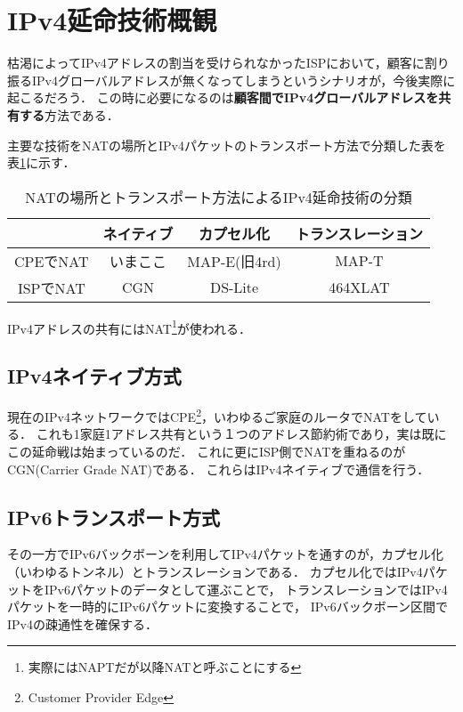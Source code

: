 \section{IPv4延命技術概観}

\lettrine{枯}
渇によってIPv4アドレスの割当を受けられなかったISPにおいて，顧客に割り振るIPv4グローバルアドレスが無くなってしまうというシナリオが，今後実際に起こるだろう．
この時に必要になるのは\textbf{顧客間でIPv4グローバルアドレスを共有する}方法である．

主要な技術をNATの場所とIPv4パケットのトランスポート方法で分類した表を表\ref{yuyarin-nat-transport}に示す．

\begin{table}[htbp]
\begin{center}
\begin{tabular}{cccc} \hline
 & ネイティブ & カプセル化 & トランスレーション \\\hline
CPEでNAT & いまここ & MAP-E(旧4rd) & MAP-T \\
ISPでNAT & CGN & DS-Lite & 464XLAT \\\hline
\end{tabular}
\end{center}
\caption{NATの場所とトランスポート方法によるIPv4延命技術の分類}
\label{yuyarin-nat-transport}
\end{table}

IPv4アドレスの共有にはNAT\footnote{実際にはNAPTだが以降NATと呼ぶことにする}が使われる．

\subsection{IPv4ネイティブ方式}

現在のIPv4ネットワークではCPE\footnote{Customer Provider Edge}，いわゆるご家庭のルータでNATをしている．
これも1家庭1アドレス共有という１つのアドレス節約術であり，実は既にこの延命戦は始まっているのだ．
これに更にISP側でNATを重ねるのがCGN(Carrier Grade NAT)である．
これらはIPv4ネイティブで通信を行う．

\subsection{IPv6トランスポート方式}
その一方でIPv6バックボーンを利用してIPv4パケットを通すのが，カプセル化（いわゆるトンネル）とトランスレーションである．
カプセル化ではIPv4パケットをIPv6パケットのデータとして運ぶことで，
トランスレーションではIPv4パケットを一時的にIPv6パケットに変換することで，
IPv6バックボーン区間でIPv4の疎通性を確保する．

